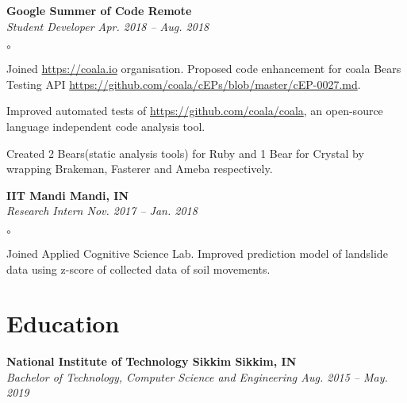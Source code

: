 \documentclass[margin,line]{resume}
\begin{document}
\begin{resume}
    \textbf{Google Summer of Code                                                                 \hfill    Remote} \\%
    \emph{Student Developer                                                         \hfill    Apr. 2018 -- Aug. 2018} %
    \begin{list}{$\circ$}{}
        \item Joined \url{https://coala.io} organisation. Proposed code enhancement for coala Bears Testing API       %
              \url{https://github.com/coala/cEPs/blob/master/cEP-0027.md}.
        \item Improved automated tests of \url{https://github.com/coala/coala}, an open-source language independent
              code analysis tool.
        \item Created 2 Bears(static analysis tools) for Ruby and 1 Bear for Crystal by wrapping Brakeman, Fasterer and
              Ameba respectively.
    \end{list}

    \textbf{IIT Mandi                                                                          \hfill    Mandi, IN} \\%
    \emph{Research Intern                                                           \hfill    Nov. 2017 -- Jan. 2018} %
    \begin{list}{$\circ$}{}
        \item Joined Applied Cognitive Science Lab. Improved prediction model of landslide data using z-score of      %
              collected data of soil movements.
    \end{list}

    \section{\mysidestyle Education}

    \textbf{National Institute of Technology Sikkim                                           \hfill    Sikkim, IN} \\%
    \emph{Bachelor of Technology, Computer Science and Engineering                   \hfill    Aug. 2015 -- May. 2019}%


\end{resume}
\end{document}
